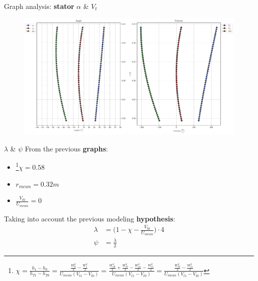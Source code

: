 {	\begin{frame}{Graph analysis: \textbf{stator} $\alpha$ \& $V_{t}$}
		\begin{figure}
			\centering
			\includegraphics[width=\textwidth]{figures/alphaAngles.pdf}
		\end{figure}
	\end{frame}
	}

	\begin{frame}{$\lambda$ \& $\psi$}
		From the previous \textbf{graphs}:
		\begin{itemize}
            \item \footnote{\vspace{0.2cm}$\chi = \frac{h_1 - h_0}{h_{T1} - h_{T0}} = \frac{\frac{W_0^2}{2} - \frac{W_1^2}{2}}{U_{mean} (V_{t1} - V_{t0})} = \frac{\frac{W_{a0}^2}{2} + \frac{W_{t0}^2}{2}- \frac{W_{a1}^2}{2} - \frac{W_{t1}^2}{2}}{U_{mean} (V_{t1} - V_{t0})} = \frac{\frac{W_{t0}^2}{2} - \frac{W_{t1}^2}{2}}{U_{mean} (V_{t1} - V_{t0})}$}$\chi = 0.58$
			\item $r_{mean} = 0.32 m$
			\item $\frac{V_{t0}}{U_{mean}} = 0$
		\end{itemize}
		Taking into account the previous modeling \textbf{hypothesis}:
		\begin{align}
			\lambda & = \Bigg( 1 - \chi - \frac{V_{t0}}{U_{mean}} \Bigg) \cdot 4 \nonumber \\
			\psi    & = \frac{\lambda}{2} \nonumber
		\end{align}
	\end{frame}
	
